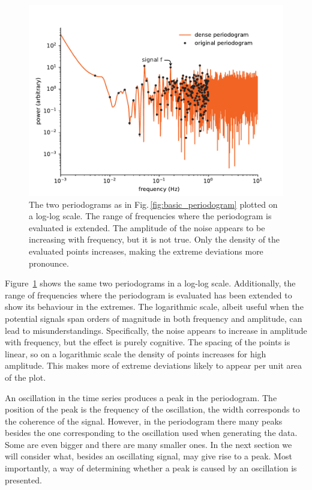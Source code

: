 \begin{figure}
  \centering \includegraphics[width=\linewidth]{gfx/axions/basic_periodogram_loglog.pdf}
  \caption{The two periodograms as in Fig.\,\ref{fig:basic_periodogram} plotted on a log-log scale. The range of frequencies where the periodogram is evaluated is extended. The amplitude of the noise appears to be increasing with frequency, but it is not true. Only the density of the evaluated points increases, making the extreme deviations more pronounce.}\label{fig:basic_periodogram_loglog}
\end{figure}

Figure~\ref{fig:basic_periodogram_loglog} shows the same two periodograms in a log-log scale. Additionally, the range of frequencies where the periodogram is evaluated has been extended to show its behaviour in the extremes. The logarithmic scale, albeit useful when the potential signals span orders of magnitude in both frequency and amplitude, can lead to misunderstandings. Specifically, the noise appears to increase in amplitude with frequency, but the effect is purely cognitive. The spacing of the points is linear, so on a logarithmic scale the density of points increases for high amplitude. This makes more of extreme deviations likely to appear per unit area of the plot.%

An oscillation in the time series produces a peak in the periodogram. The position of the peak is the frequency of the oscillation, the width corresponds to the coherence of the signal. However, in the periodogram there many peaks besides the one corresponding to the oscillation used when generating the data. Some are even bigger and there are many smaller ones. In the next section we will consider what, besides an oscillating signal, may give rise to a peak. Most importantly, a way of determining whether a peak is caused by an oscillation is presented.




